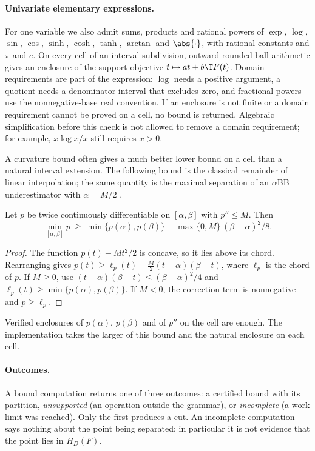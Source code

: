 \paragraph{Univariate elementary expressions.}
For one variable we also admit sums, products and rational powers of
$\exp$, $\log$, $\sin$, $\cos$, $\sinh$, $\cosh$, $\tanh$, $\arctan$ and
$\abs{\cdot}$, with rational constants and $\pi$ and $e$. On every cell
of an interval subdivision, outward-rounded ball arithmetic
\citep{Johansson2017arb} gives an enclosure of the support objective
$t\mapsto at+b\T F(t)$. Domain requirements are part of the expression:
$\log$ needs a positive argument, a quotient needs a denominator interval
that excludes zero, and fractional powers use the nonnegative-base real
convention. If an enclosure is not finite or a domain requirement cannot
be proved on a cell, no bound is returned. Algebraic simplification
before this check is not allowed to remove a domain requirement; for
example, $x\log x/x$ still requires $x>0$.

A curvature bound often gives a much better lower bound on a cell than
a natural interval extension.
The following bound is the classical remainder of linear interpolation;
the same quantity is the maximal separation of an $\alpha$BB underestimator
with $\alpha=M/2$ \citep{AdjimanEtAl1998}.

\begin{lemma}\label{lem:chord}
Let $p$ be twice continuously differentiable on $[\alpha,\beta]$ with
$p''\le M$. Then
\[
\min_{[\alpha,\beta]}p\ \ge\ \min\{p(\alpha),p(\beta)\}-\max\{0,M\}\,(\beta-\alpha)^2/8.
\]
\end{lemma}

\begin{proof}
The function $p(t)-Mt^2/2$ is concave, so it lies above its chord.
Rearranging gives
$p(t)\ge\ell_p(t)-\tfrac M2(t-\alpha)(\beta-t)$, where $\ell_p$ is the
chord of $p$. If $M\ge0$, use $(t-\alpha)(\beta-t)\le(\beta-\alpha)^2/4$
and $\ell_p(t)\ge\min\{p(\alpha),p(\beta)\}$. If $M<0$, the correction
term is nonnegative and $p\ge\ell_p$.
\end{proof}

Verified enclosures of $p(\alpha)$, $p(\beta)$ and of $p''$ on the cell
are enough. The implementation takes the larger of this bound and the
natural enclosure on each cell.

\paragraph{Outcomes.}
A bound computation returns one of three outcomes: a certified bound
with its partition, \emph{unsupported} (an operation outside the
grammar), or \emph{incomplete} (a work limit was reached). Only the
first produces a cut. An incomplete computation says nothing about the
point being separated; in particular it is not evidence that the point
lies in $H_D(F)$.


